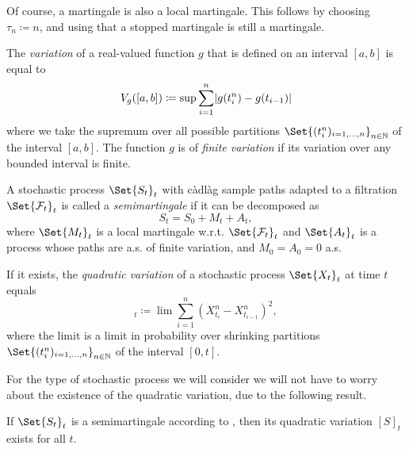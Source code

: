 Of course, a martingale is also a local martingale.
This follows by choosing \( \tau_n \coloneqq n \), and using that a stopped martingale is still a martingale.

\begin{definition}
  The \textit{variation} of a real-valued function \( g \) that is defined on an interval \( [a,b] \) is equal to
  \begin{equation}
    V_g([a,b]) \coloneqq \sup \sum_{i=1}^n \lvert g(t_i^n) - g(t_{i-1}) \rvert
  \end{equation}
  where we take the supremum over all possible partitions \(\Set{(t_i^n)_{i=1,\dots,n}}_{n\in\bN}\) of the interval \( [a,b] \).
  The function \( g \) is of \textit{finite variation} if its variation over any bounded interval is finite.
\end{definition}

\begin{definition}\label{def:semimart}
  A stochastic process \(\Set{S_t}_{t}\) with càdlàg sample paths adapted to a filtration \(\Set{\cF_t}_t\) is called a \textit{semimartingale} if it can be decomposed as
  \begin{equation}
    S_t = S_0 + M_t + A_t,
  \end{equation}
  where \( \Set{M_t}_{t} \) is a local martingale w.r.t. \(\Set{\cF_t}_t\) and \( \Set{A_t}_{t} \) is a process whose paths are a.s. of finite variation, and \( M_0 = A_0 = 0 \) a.s.
\end{definition}

\begin{definition}
  If it exists, the \textit{quadratic variation} of a stochastic process \(\Set{X_t}_{t}\) at time \( t \) equals
  \begin{equation}
    [X]_t \coloneqq \lim \sum_{i=1}^n (X_{t_i}^n - X_{t_{i-1}}^n)^2,
  \end{equation}
  where the limit is a limit in probability over shrinking partitions \(\Set{(t_i^n)_{i=1,\dots,n}}_{n\in\bN}\) of the interval \( [0,t] \).
\end{definition}

For the type of stochastic process we will consider we will not have to worry about the existence of the quadratic variation, due to the following result.

\begin{lemma}
  If \(\Set{S_t}_{t}\) is a semimartingale according to , then its quadratic variation \( [S]_t \) exists for all \( t \).
\end{lemma}


